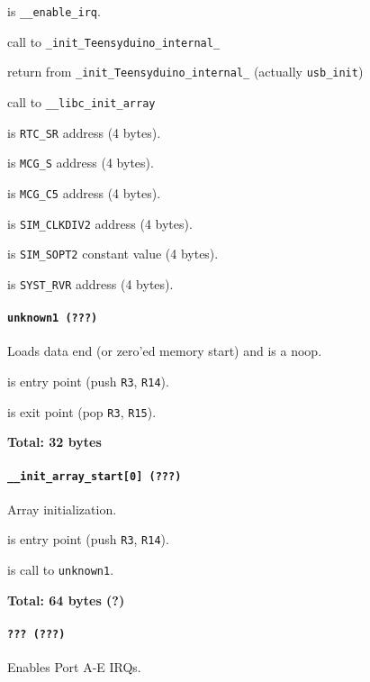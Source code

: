  is \texttt{\_\_enable\_irq}.

 call to \texttt{\_init\_Teensyduino\_internal\_}

 return from \texttt{\_init\_Teensyduino\_internal\_} (actually \texttt{usb\_init})

 call to \texttt{\_\_libc\_init\_array}

\vspace{1em}

 is \texttt{RTC\_SR} address (4 bytes).

 is \texttt{MCG\_S} address (4 bytes).

 is \texttt{MCG\_C5} address (4 bytes).

 is \texttt{SIM\_CLKDIV2} address (4 bytes).

 is \texttt{SIM\_SOPT2} constant value (4 bytes).

 is \texttt{SYST\_RVR} address (4 bytes).

\paragraph{\texttt{unknown1 (???)}} Loads data end (or zero'ed memory start) and
is a noop.

 is entry point (push \texttt{R3}, \texttt{R14}).

 is exit point (pop \texttt{R3}, \texttt{R15}).

\textbf{Total: 32 bytes}

\paragraph{\texttt{\_\_init\_array\_start[0] (???)}} Array initialization.

 is entry point (push \texttt{R3}, \texttt{R14}).

 is call to \texttt{unknown1}.

\textbf{Total: 64 bytes (?)}

\paragraph{\texttt{??? (???)}} Enables Port A-E IRQs.

